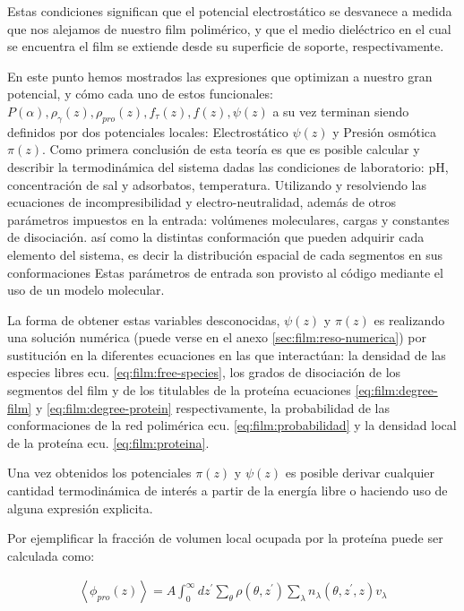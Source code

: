 Estas condiciones significan que el potencial electrost\'atico se desvanece a medida que nos alejamos de nuestro film polim\'erico,  y que el medio diel\'ectrico en el cual se encuentra el film  se extiende desde su superficie de soporte, respectivamente. 

En este punto hemos mostrados las expresiones que optimizan a nuestro gran potencial, y c\'omo cada uno de estos funcionales: $P(\alpha), \rho_\gamma(z),\rho_{pro}(z), f_\tau(z), f(z), \psi(z) $ a su vez  terminan siendo definidos por dos potenciales locales: Electrost\'atico $\psi(z)$ y Presi\'on osm\'otica $\pi(z)$. 
Como primera conclusi\'on de esta teor\'ia es que es posible calcular y describir la termodin\'amica del sistema dadas las condiciones de laboratorio: pH, concentraci\'on de sal y adsorbatos, temperatura. Utilizando y resolviendo las ecuaciones de incompresibilidad y  electro-neutralidad, adem\'as de otros par\'ametros impuestos en la entrada: vol\'umenes moleculares, cargas y constantes de disociaci\'on. as\'i como la distintas conformaci\'on que pueden adquirir cada elemento del sistema, es decir la distribuci\'on espacial de cada segmentos en sus conformaciones
Estas par\'ametros de entrada son provisto al c\'odigo mediante el uso de un modelo molecular. 

La forma de obtener estas variables desconocidas, $\psi(z)$ y $\pi(z)$  es realizando una soluci\'on num\'erica (puede verse en el anexo \ref{sec:film:reso-numerica}) por sustituci\'on en la diferentes ecuaciones en las que interact\'uan: la densidad de las especies libres ecu. \ref{eq:film:free-species}, los grados de disociaci\'on de los segmentos del film y de los  titulables de la prote\'ina ecuaciones \ref{eq:film:degree-film} y \ref{eq:film:degree-protein} respectivamente, la probabilidad de las conformaciones de la red polim\'erica ecu. \ref{eq:film:probabilidad} y la densidad local de la prote\'ina ecu. \ref{eq:film:proteina}.

Una vez obtenidos los potenciales $\pi(z)$ y $\psi(z)$ es posible derivar  cualquier cantidad termodin\'amica de inter\'es  a partir de la energ\'ia libre o haciendo uso de alguna expresi\'on explicita. 

Por ejemplificar la fracci\'on de volumen local ocupada por la prote\'ina puede ser calculada como:

\begin{align}
	\left< \phi_{pro}(z) \right> = A\int_0^\infty dz^\prime \sum_\theta \rho(\theta, z^\prime)\sum_\lambda n_\lambda(\theta, z^\prime, z)v_\lambda
\end{align}

